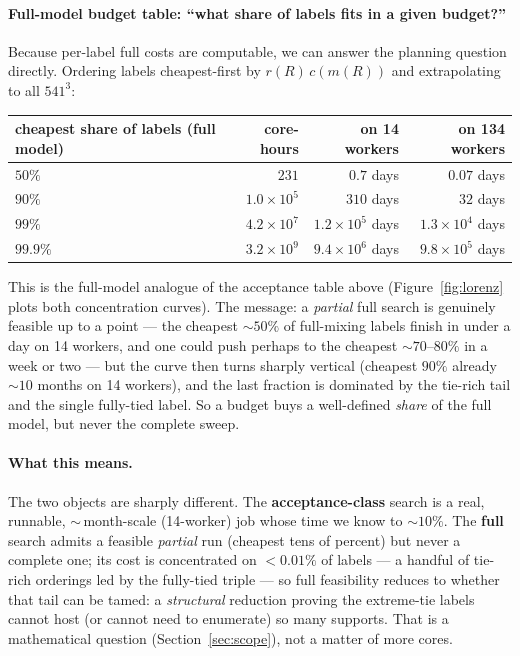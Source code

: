 \documentclass[11pt]{article}
\begin{document}
\paragraph{Full-model budget table: ``what share of labels fits in a given budget?''}
Because per-label full costs are computable, we can answer the planning question
directly. Ordering labels cheapest-first by $r(R)\,c(m(R))$ and extrapolating to all
$541^3$:
\begin{center}
\begin{tabular}{lrrr}
\toprule
cheapest share of labels (full model) & core-hours & on 14 workers & on 134 workers\\
\midrule
$50\%$   & $231$         & $0.7$ days      & $0.07$ days\\
$90\%$   & $1.0\times10^5$ & $310$ days    & $32$ days\\
$99\%$   & $4.2\times10^7$ & $1.2\times10^5$ days & $1.3\times10^4$ days\\
$99.9\%$ & $3.2\times10^9$ & $9.4\times10^6$ days & $9.8\times10^5$ days\\
\bottomrule
\end{tabular}
\end{center}
This is the full-model analogue of the acceptance table above (Figure~\ref{fig:lorenz}
plots both concentration curves). The message: a \emph{partial} full search is genuinely
feasible up to a point --- the cheapest $\sim50\%$ of full-mixing labels finish in
under a day on 14 workers, and one could push perhaps to the cheapest $\sim70$--$80\%$
in a week or two --- but the curve then turns sharply vertical (cheapest $90\%$ already
$\sim10$ months on 14 workers), and the last fraction is dominated by the tie-rich
tail and the single fully-tied label. So a budget buys a well-defined \emph{share} of
the full model, but never the complete sweep.

\paragraph{What this means.} The two objects are sharply different. The
\textbf{acceptance-class} search is a real, runnable, $\sim$\,month-scale (14-worker)
job whose time we know to $\sim$$10\%$. The \textbf{full} search admits a feasible
\emph{partial} run (cheapest tens of percent) but never a complete one; its cost is
concentrated on $<0.01\%$ of labels --- a handful of tie-rich orderings led by the
fully-tied triple --- so full feasibility reduces to whether that tail can be tamed: a
\emph{structural} reduction proving the extreme-tie labels cannot host (or cannot need
to enumerate) so many supports. That is a mathematical question
(Section~\ref{sec:scope}), not a matter of more cores.
\end{document}
